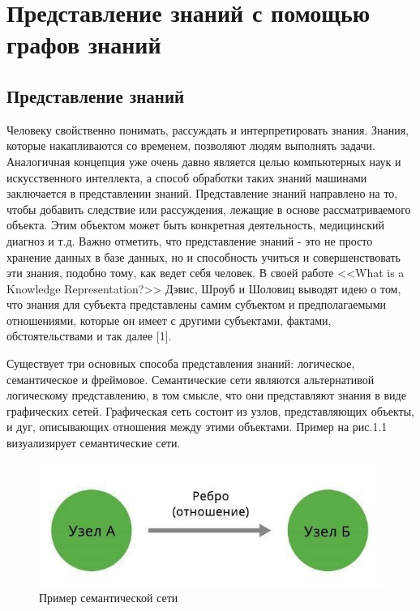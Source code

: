 \chapter{Представление знаний с помощью графов знаний} \label{ch1}



\section{Представление знаний}

Человеку свойственно понимать, рассуждать и интерпретировать знания. Знания, которые накапливаются со временем, позволяют людям выполнять
задачи. Аналогичная концепция уже очень давно является целью компьютерных наук и искусственного интеллекта, а способ обработки таких знаний
машинами заключается в представлении знаний. Представление знаний направлено на то, чтобы добавить следствие или рассуждения, лежащие в
основе рассматриваемого объекта. Этим объектом может быть конкретная деятельность, медицинский диагноз и т.д. Важно отметить, что
представление знаний - это не просто хранение данных в базе данных, но и способность учиться и совершенствовать эти знания, подобно тому, как
ведет себя человек. В своей работе <<What is a Knowledge Representation?>> Дэвис, Шроуб и Шоловиц выводят идею о том, что знания для субъекта
представлены самим субъектом и предполагаемыми отношениями, которые он имеет с другими субъектами, фактами, обстоятельствами и так далее [1].

Существует три основных способа представления знаний: логическое, семантическое и фреймовое. Семантические сети являются альтернативой
логическому представлению, в том смысле, что они представляют знания в виде графических сетей. Графическая сеть состоит из узлов,
представляющих объекты, и дуг, описывающих отношения между этими объектами. Пример на рис.1.1 визуализирует семантические сети.

\begin{figure}[ht!]
    \center
    \includegraphics[scale=0.8]{my_folder/myimg//1}
    \caption{Пример семантической сети}
\end{figure}


